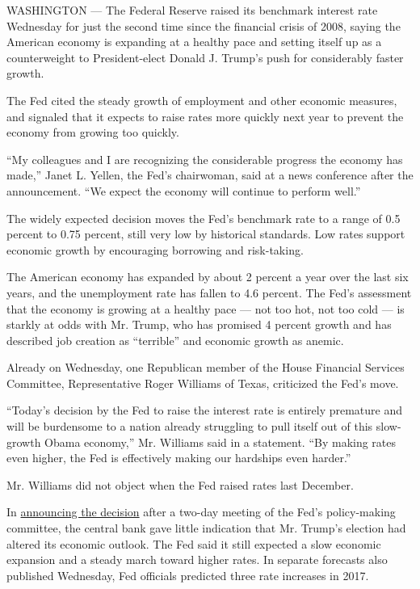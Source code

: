 WASHINGTON --- The Federal Reserve raised its benchmark interest rate
Wednesday for just the second time since the financial crisis of 2008,
saying the American economy is expanding at a healthy pace and setting
itself up as a counterweight to President-elect Donald J. Trump's push
for considerably faster growth.

The Fed cited the steady growth of employment and other economic
measures, and signaled that it expects to raise rates more quickly next
year to prevent the economy from growing too quickly.

``My colleagues and I are recognizing the considerable progress the
economy has made,'' Janet L. Yellen, the Fed's chairwoman, said at a
news conference after the announcement. ``We expect the economy will
continue to perform well.''

The widely expected decision moves the Fed's benchmark rate to a range
of 0.5 percent to 0.75 percent, still very low by historical standards.
Low rates support economic growth by encouraging borrowing and
risk-taking.

The American economy has expanded by about 2 percent a year over the
last six years, and the unemployment rate has fallen to 4.6 percent. The
Fed's assessment that the economy is growing at a healthy pace --- not
too hot, not too cold --- is starkly at odds with Mr. Trump, who has
promised 4 percent growth and has described job creation as ``terrible''
and economic growth as anemic.

Already on Wednesday, one Republican member of the House Financial
Services Committee, Representative Roger Williams of Texas, criticized
the Fed's move.

``Today's decision by the Fed to raise the interest rate is entirely
premature and will be burdensome to a nation already struggling to pull
itself out of this slow-growth Obama economy,'' Mr. Williams said in a
statement. ``By making rates even higher, the Fed is effectively making
our hardships even harder.''

Mr. Williams did not object when the Fed raised rates last December.

In
\href{https://www.federalreserve.gov/monetarypolicy/files/monetary20161214a1.pdf}{announcing
the decision} after a two-day meeting of the Fed's policy-making
committee, the central bank gave little indication that Mr. Trump's
election had altered its economic outlook. The Fed said it still
expected a slow economic expansion and a steady march toward higher
rates. In separate forecasts also published Wednesday, Fed officials
predicted three rate increases in 2017.

